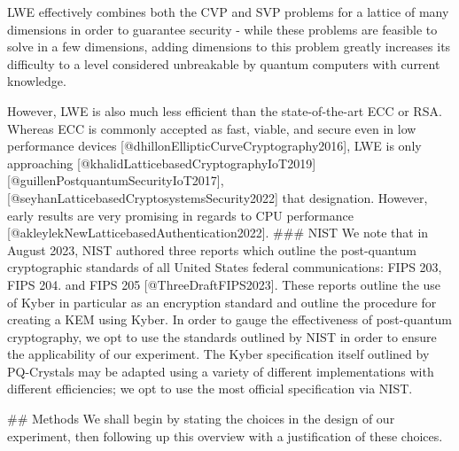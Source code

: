 \documentclass[12pt]{article}
\begin{document}
LWE effectively combines both the CVP and SVP problems for a lattice of many dimensions in order to guarantee security - while these problems are feasible to solve in a few dimensions, adding dimensions to this problem greatly increases its difficulty to a level considered unbreakable by quantum computers with current knowledge. 

However, LWE is also much less efficient than the state-of-the-art ECC or RSA. Whereas ECC is commonly accepted as fast, viable, and secure even in low performance devices [@dhillonEllipticCurveCryptography2016], LWE is only approaching [@khalidLatticebasedCryptographyIoT2019] [@guillenPostquantumSecurityIoT2017], [@seyhanLatticebasedCryptosystemsSecurity2022] that designation. However, early results are very promising in regards to CPU performance [@akleylekNewLatticebasedAuthentication2022].  
### NIST
We note that in August 2023, NIST authored three reports which outline the post-quantum cryptographic standards of all United States federal communications: FIPS 203, FIPS 204. and FIPS 205 [@ThreeDraftFIPS2023]. These reports outline the use of Kyber in particular as an encryption standard and outline the procedure for creating a KEM using Kyber. In order to gauge the effectiveness of post-quantum cryptography, we opt to use the standards outlined by NIST in order to ensure the applicability of our experiment. The Kyber specification itself outlined by PQ-Crystals may be adapted using a variety of different implementations with different efficiencies; we opt to use the most official specification via NIST. 

## Methods
We shall begin by stating the choices in the design of our experiment, then following up this overview with a justification of these choices. 
\end{document}
